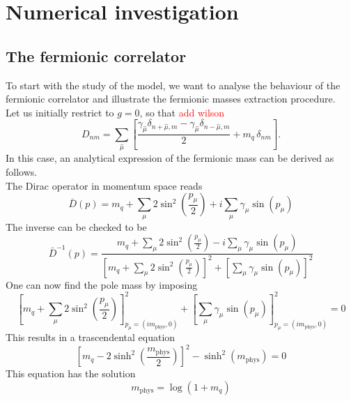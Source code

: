 \chapter{Numerical investigation}
\label{chapt:results}


\section{The fermionic correlator}
To start with the study of the model, we want to analyse the behaviour of the fermionic correlator and illustrate the fermionic masses extraction procedure. \\
Let us initially restrict to $g = 0$, so that \textcolor{red}{add wilson}
\begin{equation*}
    D_{n m}=\sum_{\hat\mu}\left[\frac{\gamma_{\hat\mu}\delta_{n+\hat\mu, m} - \gamma_{\hat\mu} \delta_{n-\hat\mu, m}}{2} + m_q \, \delta_{n m}\right] .
\end{equation*}
In this case, an analytical expression of the fermionic mass can be derived as follows. \\
The Dirac operator in momentum space reads
\begin{equation*}
\bar{D}(p)= m_q + \sum_\mu 2 \sin ^2\left(\frac{p_\mu}{2}\right)+i \sum_\mu \gamma_\mu \sin \left(p_\mu\right)
\end{equation*}
The inverse can be checked to be 
\begin{equation*}
    \bar{D}^{-1}(p) = \frac{m_q + \sum_\mu 2 \sin ^2\left(\frac{p_\mu}{2}\right) - i \sum_\mu \gamma_\mu \sin \left(p_\mu\right)}{\left[m_q + \sum_\mu 2 \sin ^2\left(\frac{p_\mu}{2}\right)\right]^2 + \left[\sum_\mu \gamma_\mu \sin \left(p_\mu\right)\right]^2}
\end{equation*}
One can now find the pole mass by imposing 
\begin{equation*}
    \left[m_q + \sum_\mu 2 \sin ^2\left(\frac{p_\mu}{2}\right)\right]^2_{p_\mu = (im_\text{phys}, 0)} + \left[\sum_\mu \gamma_\mu \sin \left(p_\mu\right)\right]^2_{p_\mu = (im_\text{phys}, 0)} = 0
\end{equation*}
This results in a trascendental equation 
\begin{equation*}
    \left[m_q - 2 \sinh^2\left(\frac{m_\text{phys}}{2}\right)\right]^2 - \sinh^2\left(m_\text{phys}\right) = 0
\end{equation*}
This equation has the solution 
\begin{equation*}
    m_\text{phys} = \log\left(1+m_q\right)
\end{equation*}
